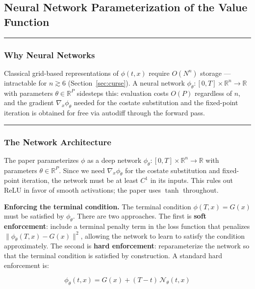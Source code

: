 \documentclass{article}
\begin{document}
\subsection{Neural Network Parameterization of the Value Function}
\label{sec:nn-param}

\medskip\hrule\medskip

\subsubsection{Why Neural Networks}

\begin{extrainfobox}
Classical grid-based representations of $\phi(t,x)$ require $O(N^n)$ storage
--- intractable for $n \gtrsim 6$ (Section~\ref{sec:curse}). A neural network
$\phi_\theta : [0,T] \times \mathbb{R}^n \to \mathbb{R}$ with parameters
$\theta \in \mathbb{R}^P$ sidesteps this: evaluation costs $O(P)$ regardless
of $n$, and the gradient $\nabla_x\phi_\theta$ needed for the costate
substitution and the fixed-point iteration is obtained for free via autodiff
through the forward pass.
\end{extrainfobox}

\medskip\hrule\medskip

\subsubsection{The Network Architecture}

The paper parameterizes $\phi$ as a deep network
$\phi_\theta : [0,T] \times \mathbb{R}^n \to \mathbb{R}$ with parameters
$\theta \in \mathbb{R}^P$. Since we need $\nabla_x\phi_\theta$ for the
costate substitution and fixed-point iteration, the network must be at least
$C^1$ in its inputs. This rules out ReLU in favor of smooth activations;
the paper uses $\tanh$ throughout.

\textbf{Enforcing the terminal condition.} The terminal condition $\phi(T,x) =
G(x)$ must be satisfied by $\phi_\theta$. There are two approaches. The first
is \textbf{soft enforcement}: include a terminal penalty term in the loss
function that penalizes $\|\phi_\theta(T,x) - G(x)\|^2$, allowing the network
to learn to satisfy the condition approximately. The second is \textbf{hard
enforcement}: reparameterize the network so that the terminal condition is
satisfied by construction. A standard hard enforcement is:

\begin{equation}
    \phi_\theta(t,x) = G(x) + (T - t)\, \mathcal{N}_\theta(t,x)
    \label{eq:hard_terminal}
\end{equation}
\end{document}
